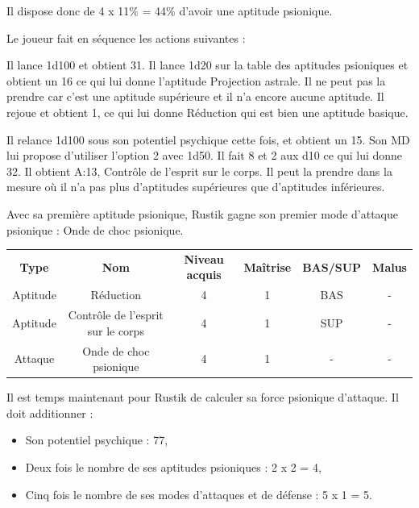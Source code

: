 \documentclass[11pt]{article}
\begin{document}
{\bigskip

Il dispose donc de 4 x 11\% = 44\% d'avoir une aptitude psionique.

\bigskip

Le joueur fait en séquence les actions suivantes :

\bigskip

Il lance 1d100 et obtient 31. Il lance 1d20 sur la table des aptitudes psioniques et obtient un 16 ce qui lui donne l'aptitude Projection astrale. Il ne peut pas la prendre car c'est une aptitude supérieure et il n'a encore aucune aptitude. Il rejoue et obtient 1, ce qui lui donne Réduction qui est bien une aptitude basique.

\bigskip

Il relance 1d100 sous son potentiel psychique cette fois, et obtient un 15. Son MD lui propose d'utiliser l'option 2 avec 1d50. Il fait 8 et 2 aux d10 ce qui lui donne 32. Il obtient A:13, Contrôle de l'esprit sur le corps. Il peut la prendre dans la mesure où il n'a pas plus d'aptitudes supérieures que d'aptitudes inférieures.

\bigskip

Avec sa première aptitude psionique, Rustik gagne son premier mode d'attaque psionique : Onde de choc psionique.

\bigskip

\begin{tabular}{cccccc}
\textbf{Type }& \textbf{Nom} & \textbf{Niveau acquis} & \textbf{Maîtrise}  & \textbf{BAS/SUP} & \textbf{Malus} \\
Aptitude &  Réduction                        & 4 & 1 & BAS & - \\
Aptitude & Contrôle de l'esprit sur le corps & 4 & 1 & SUP & - \\
Attaque  & Onde de choc psionique            & 4 & 1 & -   & - \\
\end{tabular}

\bigskip

Il est temps maintenant pour Rustik de calculer sa force psionique d'attaque. Il doit additionner :

\bigskip

\begin{itemize}
\item Son potentiel psychique : 77,
\item Deux fois le nombre de ses aptitudes psioniques : 2 x 2 = 4,
\item Cinq fois le nombre de ses modes d'attaques et de défense : 5 x 1 = 5.
\end{itemize}

}
\end{document}
